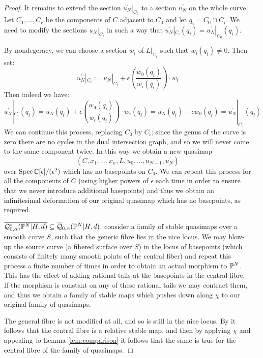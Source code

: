 \begin{proof}
It remains to extend the section $u_N^\prime|_{C_0}$ to a section $u_N^\prime$ on the whole curve. Let $C_1, \ldots, C_r$ be the components of $C$ adjacent to $C_0$ and let $q_i = C_0 \cap C_i$. We need to modify the sections $u_N|_{C_i}$ in such a way that $u_N^\prime|_{C_i}(q_i) = u_N^\prime|_{C_0}(q_i)$.

By nondegeracy, we can choose a section $w_i$ of $L|_{C_i}$ such that $w_i(q_i) \neq 0$. Then set:
\begin{equation*} {u_N^\prime}|_{C_i} := {u_N}|_{C_i} + \epsilon \left( \frac{w_0(q_i)}{w_i(q_i)} \right) \cdot w_i \end{equation*}
Then indeed we have:
\begin{equation*} {u_N^\prime}|_{C_i}(q_i) = u_N(q_i) + \epsilon \left( \frac{w_0(q_i)}{w_i(q_i)} \right) \cdot w_i(q_i) = u_N(q_i) + \epsilon w_0(q_i) = {u_N^\prime}|_{C_0}(q_i) \end{equation*}
We can continue this process, replacing $C_0$ by $C_i$; since the genus of the curve is zero there are no cycles in the dual intersection graph, and so we will never come to the same component twice. In this way we obtain a new quasimap
\begin{equation*} (C,x_1,\ldots,x_n,L,u_0, \ldots, u_{N-1}, u_N^\prime) \end{equation*}
over $\operatorname{Spec} \mathbb{C}[\epsilon]/(\epsilon^2)$ which has no basepoints on $C_0$. We can repeat this process for all the components of $C$ (using higher powers of $\epsilon$ each time in order to ensure that we never introduce additional basepoints) and thus we obtain an infinitesimal deformation of our original quasimap which has no basepoints, as required.

$\overline{\mathcal{Q}^{\circ}_{0,\alpha}(\mathbb P^N|H,d)}\subseteq\overline{\mathcal Q}_{0,\alpha}(\mathbb P^N|H,d)$: consider a family of stable quasimaps over a smooth curve $S$, such that the generic fibre lies in the nice locus. We may  blow-up the source curve (a fibered surface over $S$) in the locus of basepoints (which consists of finitely many smooth points of the central fiber) and repeat this process a finite number of times in order to obtain an actual morphism to $\mathbb P^N$. This has the effect of adding rational tails at the basepoints in the central fibre. If the morphism is constant on any of these rational tails we may contract them, and thus we obtain a family of stable maps which pushes down along $\chi$ to our original family of quasimaps.

The general fibre is not modified at all, and so is still in the nice locus. By \cite[Lemma 1.9]{Ga} it follows that the central fibre is a relative stable map, and then by applying $\chi$ and appealing to Lemma \ref{lem:comparison} it follows that the same is true for the central fibre of the family of quasimaps.
\end{proof}

